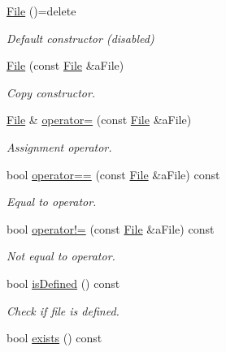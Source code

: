 \begin{DoxyCompactItemize}
\item 
\hyperlink{classlibrary_1_1core_1_1fs_1_1_file_a7490060f19a21d4ee58bb6cec87a1ca6}{File} ()=delete
\begin{DoxyCompactList}\small\item\em Default constructor (disabled) \end{DoxyCompactList}\item 
\hyperlink{classlibrary_1_1core_1_1fs_1_1_file_a6f3f0d79545ac9984c6f49432f0c6c39}{File} (const \hyperlink{classlibrary_1_1core_1_1fs_1_1_file}{File} \&a\+File)
\begin{DoxyCompactList}\small\item\em Copy constructor. \end{DoxyCompactList}\item 
\hyperlink{classlibrary_1_1core_1_1fs_1_1_file}{File} \& \hyperlink{classlibrary_1_1core_1_1fs_1_1_file_a2bea020568e39a80c69be787418c28ba}{operator=} (const \hyperlink{classlibrary_1_1core_1_1fs_1_1_file}{File} \&a\+File)
\begin{DoxyCompactList}\small\item\em Assignment operator. \end{DoxyCompactList}\item 
bool \hyperlink{classlibrary_1_1core_1_1fs_1_1_file_a44ab79a23c5a129be298a026dbeec62f}{operator==} (const \hyperlink{classlibrary_1_1core_1_1fs_1_1_file}{File} \&a\+File) const
\begin{DoxyCompactList}\small\item\em Equal to operator. \end{DoxyCompactList}\item 
bool \hyperlink{classlibrary_1_1core_1_1fs_1_1_file_a0354b6dd59250c07cd5a8b679dc36d95}{operator!=} (const \hyperlink{classlibrary_1_1core_1_1fs_1_1_file}{File} \&a\+File) const
\begin{DoxyCompactList}\small\item\em Not equal to operator. \end{DoxyCompactList}\item 
bool \hyperlink{classlibrary_1_1core_1_1fs_1_1_file_a2044eecd956aaf55b4c55872485e1bf9}{is\+Defined} () const
\begin{DoxyCompactList}\small\item\em Check if file is defined. \end{DoxyCompactList}\item 
bool \hyperlink{classlibrary_1_1core_1_1fs_1_1_file_a61851886b6bf66cd0f179b6c7bd7f972}{exists} () const

\end{DoxyCompactItemize}
